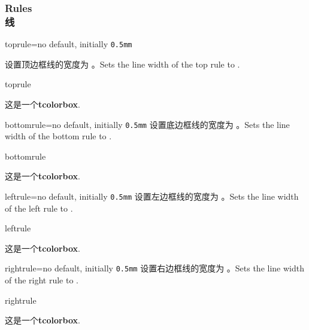 \setcounter{section}{4}
\setcounter{subsection}{7}
\setcounter{subsubsection}{1}

\subsubsection{Rules\\线}
\begin{docTcbKey}{toprule}{=}{no default, initially \texttt{0.5mm}}

设置顶边框线的宽度为 。\hfill Sets the line width of the top rule to .
\begin{exdispExample}{toprule}

\begin{tcolorbox}[toprule=3mm]
这是一个\textbf{tcolorbox}.
\end{tcolorbox}
\end{exdispExample}
\end{docTcbKey}


\begin{docTcbKey}{bottomrule}{=}{no default, initially \texttt{0.5mm}}
设置底边框线的宽度为 。\hfill Sets the line width of the bottom rule to .
\begin{exdispExample}{bottomrule}

\begin{tcolorbox}[bottomrule=3mm]
这是一个\textbf{tcolorbox}.
\end{tcolorbox}
\end{exdispExample}
\end{docTcbKey}

\begin{docTcbKey}{leftrule}{=}{no default, initially \texttt{0.5mm}}
设置左边框线的宽度为 。\hfill Sets the line width of the left rule to .
\begin{exdispExample}{leftrule}

\begin{tcolorbox}[leftrule=3mm]
这是一个\textbf{tcolorbox}.
\end{tcolorbox}
\end{exdispExample}
\end{docTcbKey}


\begin{docTcbKey}{rightrule}{=}{no default, initially \texttt{0.5mm}}
设置右边框线的宽度为 。\hfill Sets the line width of the right rule to .
\begin{exdispExample}{rightrule}

\begin{tcolorbox}[rightrule=3mm]
这是一个\textbf{tcolorbox}.
\end{tcolorbox}
\end{exdispExample}
\end{docTcbKey}




